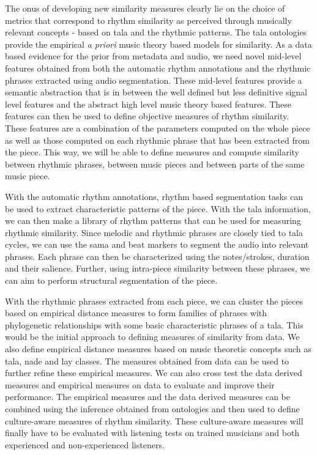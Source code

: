 The onus of developing new similarity measures clearly lie on the choice of metrics that correspond to rhythm similarity as perceived through musically relevant concepts - based on \gls{tala} and the rhythmic patterns. The \gls{tala} ontologies provide the empirical \textit{a priori} music theory based models for similarity. As a data based evidence for the prior from metadata and audio, we need novel mid-level features obtained from both the automatic rhythm annotations and the rhythmic phrases extracted using audio segmentation. These mid-level features provide a semantic abstraction that is in between the well defined but less definitive signal level features and the abstract high level music theory based features. These features can then be used to define objective measures of rhythm similarity. These features are a combination of the parameters computed on the whole piece as well as those computed on each rhythmic phrase that has been extracted from the piece. This way, we will be able to define measures and compute similarity between rhythmic phrases, between music pieces and between parts of the same music piece. 

With the automatic rhythm annotations, rhythm based segmentation tasks can be used to extract characteristic patterns of the piece. With the \gls{tala} information, we can then make a library of rhythm patterns that can be used for measuring rhythmic similarity. Since melodic and rhythmic phrases are closely tied to \gls{tala} cycles, we can use the \gls{sama} and beat markers to segment the audio into relevant phrases. Each phrase can then be characterized using the notes/strokes, duration and their salience. Further, using intra-piece similarity between these phrases, we can aim to perform structural segmentation of the piece. 

With the rhythmic phrases extracted from each piece, we can cluster the pieces based on empirical distance measures to form families of phrases with phylogenetic relationships with some basic characteristic phrases of a \gls{tala}. This would be the initial approach to defining measures of similarity from data. We also define empirical distance measures based on music theoretic concepts such as \gls{tala}, \gls{nade} and \gls{lay} classes. The measures obtained from data can be used to further refine these empirical measures. We can also cross test the data derived measures and empirical measures on data to evaluate and improve their performance. The empirical measures and the data derived measures can be combined using the inference obtained from ontologies and then used to define culture-aware measures of rhythm similarity. These culture-aware measures will finally have to be evaluated with listening tests on trained musicians and both experienced and non-experienced listeners. 
%
